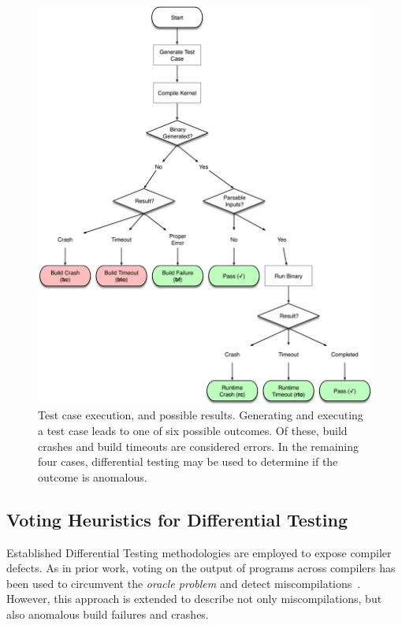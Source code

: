 \begin{figure}
  \centering %
  \includegraphics[width=\columnwidth]{img/testcase-flow-chart}
  \caption[Test case execution, and possible results]{%
    Test case execution, and possible results. Generating and executing a test case leads to one of six possible outcomes. Of these, build crashes and build timeouts are considered errors. In the remaining four cases, differential testing may be used to determine if the outcome is anomalous.%
  }%
  \label{fig:test-process}
\end{figure}


\subsection{Voting Heuristics for Differential Testing}

Established Differential Testing methodologies are employed to expose compiler defects. As in prior work, voting on the output of programs across compilers has been used to circumvent the \emph{oracle problem} and detect miscompilations~\cite{McKeeman1998}. However, this approach is extended to describe not only miscompilations, but also anomalous build failures and crashes.

